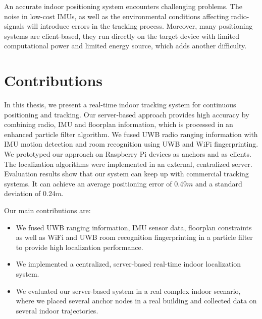 \noindent\hspace*{5mm}%
An accurate indoor positioning system encounters challenging problems. The noise in low-cost IMUs, as well as the environmental conditions affecting radio-signals will introduce errors in the tracking process. Moreover, many positioning systems are client-based, they run directly on the target device with limited computational power and limited energy source, which adds another difficulty.



\section{Contributions}

In this thesis, we present a real-time indoor tracking system for continuous positioning and tracking. Our server-based approach provides high accuracy by combining radio, IMU and floorplan information, which is processed in an enhanced particle filter algorithm. We fused UWB radio ranging information with IMU motion detection and room recognition using UWB and WiFi fingerprinting. \\
\noindent\hspace*{5mm}%
We prototyped our approach on Raspberry Pi devices as anchors and as clients. The localization algorithms were implemented in an external, centralized server.
Evaluation results show that our system can keep up with commercial tracking systems. It can achieve an average positioning error of 0.49$m$ and a standard deviation of 0.24$m$.

Our main contributions are:
\begin{itemize}
\item We fused UWB ranging information, IMU sensor data, floorplan constraints as well as WiFi and UWB room recognition fingerprinting in a particle filter to provide high localization performance. 
\item We implemented a centralized, server-based real-time indoor localization system.
\item We evaluated our server-based system in a real complex indoor scenario, where we placed several anchor nodes in a real building and collected data on several indoor trajectories. 
\end{itemize}



